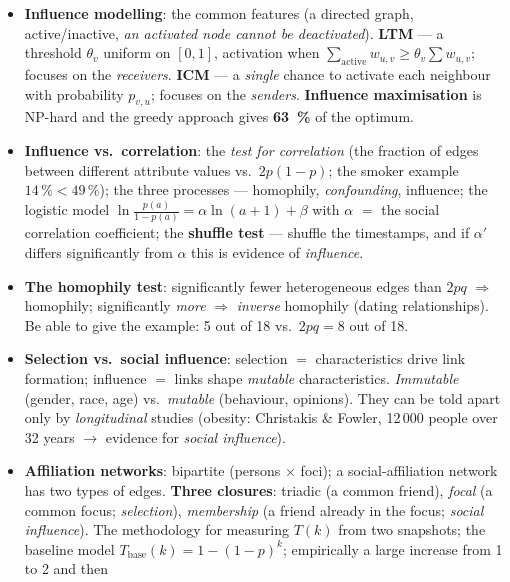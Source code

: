 \documentclass[11pt,a4paper]{article}
\theoremstyle{definition}
\begin{document}
\begin{itemize}
      a mixed model (the halo effect). \textbf{Centralisation} and the \emph{core-periphery} structure
      (bow-tie analysis).
\item \textbf{Influence modelling}: the common features (a directed graph, active/inactive, \emph{an
      activated node cannot be deactivated}). \textbf{LTM} --- a threshold $\theta_v$ uniform on
      $[0,1]$, activation when $\sum_{\text{active}}w_{u,v}\ge\theta_v\sum w_{u,v}$; focuses on the
      \emph{receivers}. \textbf{ICM} --- a \emph{single} chance to activate each neighbour with
      probability $p_{v,u}$; focuses on the \emph{senders}. \textbf{Influence maximisation} is NP-hard
      and the greedy approach gives \textbf{63~\%} of the optimum.
\item \textbf{Influence vs.\ correlation}: the \emph{test for correlation} (the fraction of edges
      between different attribute values vs.\ $2p(1-p)$; the smoker example $14\,\%<49\,\%$); the three
      processes --- homophily, \emph{confounding}, influence; the logistic model
      $\ln\frac{p(a)}{1-p(a)}=\alpha\ln(a+1)+\beta$ with $\alpha$ $=$ the social correlation
      coefficient; the \textbf{shuffle test} --- shuffle the timestamps, and if $\alpha'$ differs
      significantly from $\alpha$ this is evidence of \emph{influence}.
\item \textbf{The homophily test}: significantly fewer heterogeneous edges than $2pq$ $\Rightarrow$
      homophily; significantly \emph{more} $\Rightarrow$ \emph{inverse} homophily (dating
      relationships). Be able to give the example: 5 out of 18 vs.\ $2pq=8$ out of 18.
\item \textbf{Selection vs.\ social influence}: selection $=$ characteristics drive link formation;
      influence $=$ links shape \emph{mutable} characteristics. \emph{Immutable} (gender, race, age)
      vs.\ \emph{mutable} (behaviour, opinions). They can be told apart only by \emph{longitudinal}
      studies (obesity: Christakis \& Fowler, 12\,000 people over 32 years $\to$ evidence for
      \emph{social influence}).
\item \textbf{Affiliation networks}: bipartite (persons $\times$ foci); a social-affiliation network has
      two types of edges. \textbf{Three closures}: triadic (a common friend), \emph{focal} (a common
      focus; \emph{selection}), \emph{membership} (a friend already in the focus; \emph{social
      influence}). The methodology for measuring $T(k)$ from two snapshots; the baseline model
      $T_{\text{base}}(k)=1-(1-p)^k$; empirically a large increase from 1 to 2 and then

\end{itemize}
\end{document}
